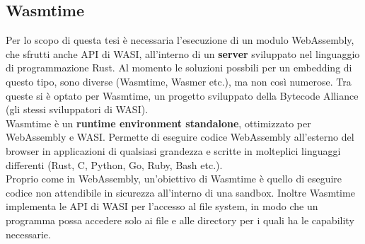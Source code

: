 \subsection{Wasmtime}
Per lo scopo di questa tesi è necessaria l'esecuzione di un modulo WebAssembly, che sfrutti anche API di WASI, all'interno di un \textbf{server} sviluppato nel linguaggio di programmazione Rust.
Al momento le soluzioni possbili per un embedding di questo tipo, sono diverse (Wasmtime, Wasmer etc.), ma non così numerose.
Tra queste si è optato per Wasmtime, un progetto sviluppato della Bytecode Alliance (gli stessi sviluppatori di WASI).
\\Wasmtime è un \textbf{runtime environment standalone}, ottimizzato per WebAssembly e WASI.
Permette di eseguire codice WebAssembly all'esterno del browser in applicazioni di qualsiasi grandezza e scritte in molteplici linguaggi differenti (Rust, C, Python, Go, Ruby, Bash etc.).
\\Proprio come in WebAssembly, un'obiettivo di Wasmtime è quello di eseguire codice non attendibile in sicurezza all'interno di una sandbox.
Inoltre Wasmtime implementa le API di WASI per l'accesso al file system, in modo che un programma possa accedere solo ai file e alle directory per i quali ha le capability necessarie.
\cite*{wasmtime}
\newpage
